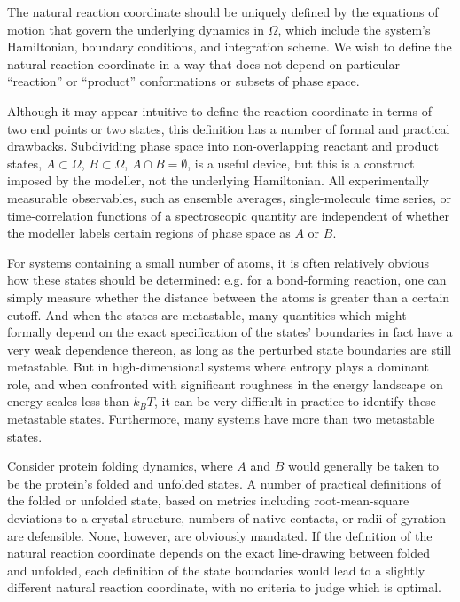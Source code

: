 \documentclass[aip, jcp, reprint, nolinenumbers, twocolumn, nobalancelastpage]{revtex4-1}
\begin{document}
The natural reaction coordinate should be uniquely defined by the equations of motion that govern the underlying dynamics in $\Omega$, which include the system's Hamiltonian, boundary conditions, and integration scheme. We wish to define the natural reaction coordinate in a way that does not depend on particular ``reaction'' or ``product'' conformations or subsets of phase space.

Although it may appear intuitive to define the reaction coordinate in terms of two end points or two states, this definition has a number of formal and practical drawbacks. Subdividing phase space into non-overlapping reactant and product states, $A \subset \Omega$, $B \subset \Omega$, $A \cap B = \emptyset$, is a useful device, but this is a construct imposed by the modeller, not the underlying Hamiltonian. All experimentally measurable observables, such as ensemble averages, single-molecule time series, or time-correlation functions of a spectroscopic quantity are independent of whether the modeller labels certain regions of phase space as $A$ or $B$.


For systems containing a small number of atoms, it is often relatively obvious how these states should be determined: e.g. for a bond-forming reaction, one can simply measure whether the distance between the atoms is greater than a certain cutoff. And when the states are metastable, many quantities which might formally depend on the exact specification of the states' boundaries in fact have a very weak dependence thereon, as long as the perturbed state boundaries are still metastable.\cite{hummer2004from} But in high-dimensional systems where entropy plays a dominant role, and when confronted with significant roughness in the energy landscape on energy scales less than $k_BT$, it can be very difficult in practice to identify these metastable states. Furthermore, many systems have more than two metastable states.

Consider protein folding dynamics, where $A$ and $B$ would generally be taken to be the protein's folded and unfolded states. A number of practical definitions of the folded or unfolded state, based on metrics including root-mean-square deviations to a crystal structure, numbers of native contacts, or radii of gyration are defensible. None, however, are obviously mandated. If the definition of the natural reaction coordinate depends on the exact line-drawing between folded and unfolded, each definition of the state boundaries would lead to a slightly different natural reaction coordinate, with no criteria to judge which is optimal.
\end{document}
